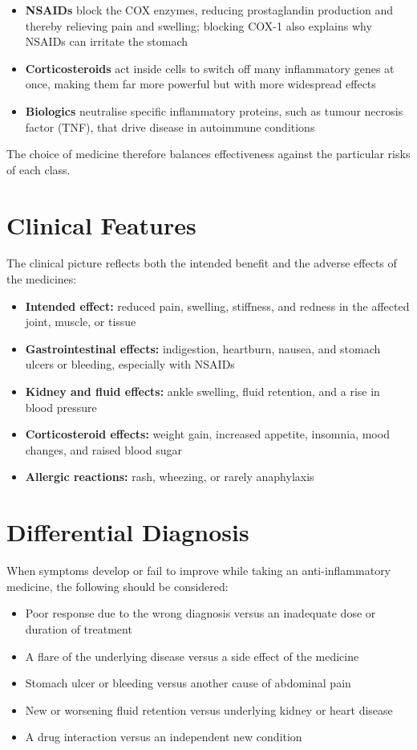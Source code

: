 \begin{itemize}
    \item \textbf{NSAIDs} block the COX enzymes, reducing prostaglandin production and thereby relieving pain and swelling; blocking COX-1 also explains why NSAIDs can irritate the stomach
    \item \textbf{Corticosteroids} act inside cells to switch off many inflammatory genes at once, making them far more powerful but with more widespread effects
    \item \textbf{Biologics} neutralise specific inflammatory proteins, such as tumour necrosis factor (TNF), that drive disease in autoimmune conditions
\end{itemize}

The choice of medicine therefore balances effectiveness against the particular risks of each class.

\section*{Clinical Features}
The clinical picture reflects both the intended benefit and the adverse effects of the medicines:

\begin{itemize}
    \item \textbf{Intended effect:} reduced pain, swelling, stiffness, and redness in the affected joint, muscle, or tissue
    \item \textbf{Gastrointestinal effects:} indigestion, heartburn, nausea, and stomach ulcers or bleeding, especially with NSAIDs
    \item \textbf{Kidney and fluid effects:} ankle swelling, fluid retention, and a rise in blood pressure
    \item \textbf{Corticosteroid effects:} weight gain, increased appetite, insomnia, mood changes, and raised blood sugar
    \item \textbf{Allergic reactions:} rash, wheezing, or rarely anaphylaxis
\end{itemize}

\section*{Differential Diagnosis}
When symptoms develop or fail to improve while taking an anti-inflammatory medicine, the following should be considered:

\begin{itemize}
    \item Poor response due to the wrong diagnosis versus an inadequate dose or duration of treatment
    \item A flare of the underlying disease versus a side effect of the medicine
    \item Stomach ulcer or bleeding versus another cause of abdominal pain
    \item New or worsening fluid retention versus underlying kidney or heart disease
    \item A drug interaction versus an independent new condition
\end{itemize}

